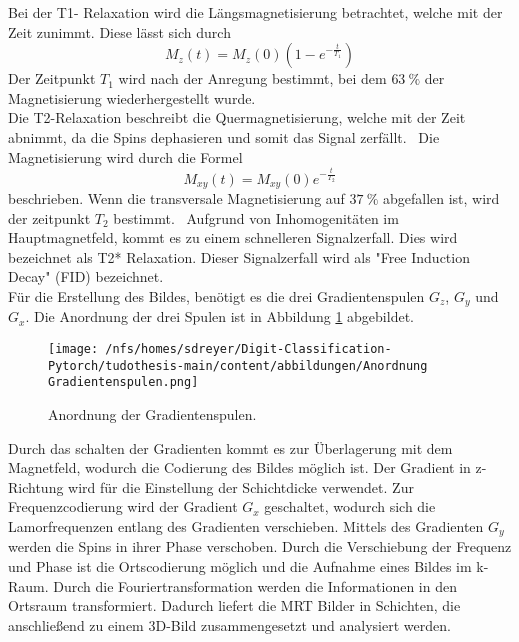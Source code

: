 Bei der T1- Relaxation wird die Längsmagnetisierung betrachtet, welche mit der Zeit zunimmt.
Diese lässt sich durch 
\begin{equation}
    M_z(t) = M_z(0) (1 - e^{-\frac{t}{T_1}})
\end{equation}
Der Zeitpunkt $T_1$ wird nach der Anregung bestimmt, bei dem $\qty{63}{\%}$ der Magnetisierung wiederhergestellt wurde.~\cite{Pollmann}\\
Die T2-Relaxation beschreibt die Quermagnetisierung, welche mit der Zeit abnimmt, da die Spins dephasieren und somit das Signal zerfällt.~\cite{Dössel}
Die Magnetisierung wird durch die Formel
\begin{equation}
    M_{xy}(t) = M_{xy}(0) e^{-\frac{t}{T_2}} 
\end{equation}
beschrieben.
Wenn die transversale Magnetisierung auf $\qty{37}{\%}$ abgefallen ist, wird der zeitpunkt $T_2$ bestimmt.~\cite{Pollmann}
Aufgrund von Inhomogenitäten im Hauptmagnetfeld, kommt es zu einem schnelleren Signalzerfall. Dies wird bezeichnet als T2* Relaxation.
Dieser Signalzerfall wird als "Free Induction Decay" (FID) bezeichnet.~\cite{Dössel}\\

Für die Erstellung des Bildes, benötigt es die drei Gradientenspulen $G_z$, $G_y$ und $G_x$. Die Anordnung der drei Spulen 
ist in Abbildung \ref{fig:an Grad} abgebildet.
\begin{figure}[H]
  \centering
  \texttt{[image: /nfs/homes/sdreyer/Digit-Classification-Pytorch/tudothesis-main/content/abbildungen/Anordnung Gradientenspulen.png]}
  \caption{Anordnung der Gradientenspulen.\cite{Schlegel}}
  \label{fig:an Grad}
\end{figure}
Durch das schalten der Gradienten kommt es zur Überlagerung mit dem Magnetfeld, wodurch die Codierung des Bildes möglich ist.
Der Gradient in z-Richtung wird für die Einstellung der Schichtdicke verwendet. 
Zur Frequenzcodierung wird der Gradient $G_x$ geschaltet, wodurch sich die Lamorfrequenzen entlang des Gradienten verschieben.
Mittels des Gradienten $G_y$ werden die Spins in ihrer Phase verschoben.
Durch die Verschiebung der Frequenz und Phase ist die Ortscodierung möglich und die Aufnahme eines Bildes im k-Raum.
Durch die Fouriertransformation werden die Informationen in den Ortsraum transformiert.
Dadurch liefert die MRT Bilder in Schichten, die anschließend zu einem 3D-Bild zusammengesetzt und analysiert werden.~\cite{pabst2013}

